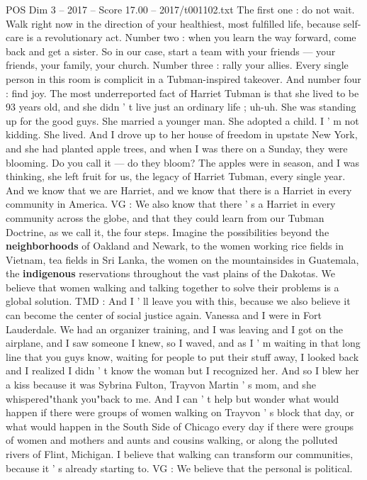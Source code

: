 \begin{textsample}{POS Dim 3 – 2017 – Score 17.00 – 2017/t001102.txt}
The first one : do not wait.
Walk right now in the direction of your healthiest, most fulfilled life, because self-care is a revolutionary act.
Number two : when you learn the way forward, come back and get a sister.
So in our case, start a team with your friends — your friends, your family, your church.
Number three : rally your allies.
Every single person in this room is complicit in a Tubman-inspired takeover.
And number four : find joy.
The most underreported fact of Harriet Tubman is that she lived to be 93 years old, and she didn ' t live just an ordinary life ; uh-uh.
She was standing up for the good guys.
She married a younger man.
She adopted a child.
I ' m not kidding.
She lived.
And I drove up to her house of freedom in upstate New York, and she had planted apple trees, and when I was there on a Sunday, they were blooming.
Do you call it — do they bloom?
The apples were in season, and I was thinking, she left fruit for us, the legacy of Harriet Tubman, every single year.
And we know that we are Harriet, and we know that there is a Harriet in every community in America.
VG : We also know that there ' s a Harriet in every community across the globe, and that they could learn from our Tubman Doctrine, as we call it, the four steps.
Imagine the possibilities beyond the \textbf{neighborhoods} of Oakland and Newark, to the women working rice fields in Vietnam, tea fields in Sri Lanka, the women on the mountainsides in Guatemala, the \textbf{indigenous} reservations throughout the vast plains of the Dakotas.
We believe that women walking and talking together to solve their problems is a global solution.
TMD : And I ' ll leave you with this, because we also believe it can become the center of social justice again.
Vanessa and I were in Fort Lauderdale.
We had an organizer training, and I was leaving and I got on the airplane, and I saw someone I knew, so I waved, and as I ' m waiting in that long line that you guys know, waiting for people to put their stuff away, I looked back and I realized I didn ' t know the woman but I recognized her.
And so I blew her a kiss because it was Sybrina Fulton, Trayvon Martin ' s mom, and she whispered"thank you"back to me.
And I can ' t help but wonder what would happen if there were groups of women walking on Trayvon ' s block that day, or what would happen in the South Side of Chicago every day if there were groups of women and mothers and aunts and cousins walking, or along the polluted rivers of Flint, Michigan.
I believe that walking can transform our communities, because it ' s already starting to.
VG : We believe that the personal is political.

\end{textsample}
